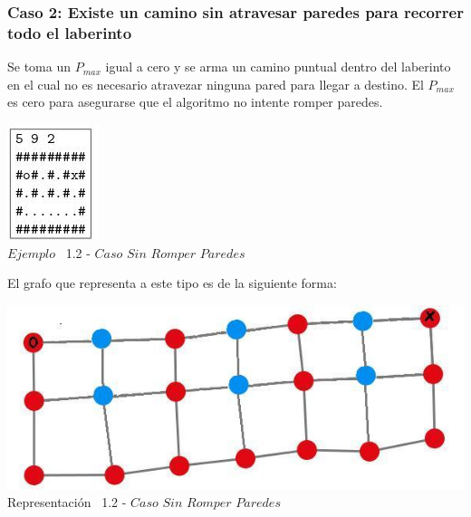  \begin{center}
 \subsubsection*{Caso 2: Existe un camino sin atravesar paredes para recorrer todo el laberinto}
\end{center}

Se toma un $P_{max}$ igual a cero y se arma un camino puntual dentro del laberinto en el cual no es necesario atravezar ninguna pared para llegar a destino. El $P_{max}$ es cero para asegurarse que el algoritmo no intente romper paredes.\\
 
\vspace*{0.3cm} \vspace*{0.3cm}
  \begin{center}
 \includegraphics[scale=1.6]{./EJ1/ej1solucionsinpared.jpeg}
 \\{$Ejemplo$ \ 1.2 - $Caso$ $Sin$ $Romper$ $Paredes$}
  \end{center}
  \vspace*{0.3cm}

El grafo que representa a este tipo es de la siguiente forma:\\

\vspace*{0.3cm} \vspace*{0.3cm}
  \begin{center}
 \includegraphics[scale=0.5]{./EJ1/ej1grafosolucionsinpared.jpeg}
 \\{Representaci\'on \ 1.2 - $Caso$ $Sin$ $Romper$ $Paredes$}
  \end{center}
  \vspace*{0.3cm}

